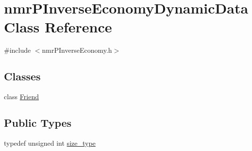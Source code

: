 \hypertarget{classnmr_p_inverse_economy_dynamic_data}{\section{nmr\-P\-Inverse\-Economy\-Dynamic\-Data Class Reference}
\label{classnmr_p_inverse_economy_dynamic_data}
}


{\ttfamily \#include $<$nmr\-P\-Inverse\-Economy.\-h$>$}

\subsection*{Classes}
\begin{DoxyCompactItemize}
\item 
class \hyperlink{classnmr_p_inverse_economy_dynamic_data_1_1_friend}{Friend}
\end{DoxyCompactItemize}
\subsection*{Public Types}
\begin{DoxyCompactItemize}
\item 
typedef unsigned int \hyperlink{classnmr_p_inverse_economy_dynamic_data_a32ab8d601abf927292b49d0cea124f9b}{size\-\_\-type}
\end{DoxyCompactItemize}
